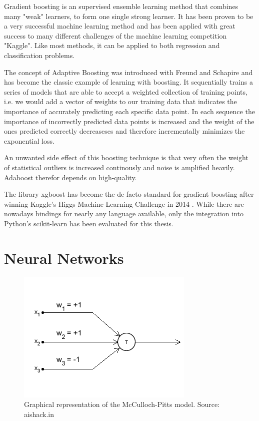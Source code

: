 Gradient boosting is an supervised ensemble learning method that combines many "weak" learners, to form one single strong learner.  It has been proven to be a very successful machine learning method and has been applied with great success to many different challenges of the machine learning competition "Kaggle". Like most methods, it can be applied to both regression and classification problems.

The concept of Adaptive Boosting was introduced with \cite{Freund97adecision-theoretic} Freund and Schapire and has become the classic example of learning with boosting. It sequentially trains a series of models that are able to accept a weighted collection of training points, i.e. we would add a vector of weights to our training data that indicates the importance of accurately predicting each specific data point. In each sequence the importance of incorrectly predicted data points is increased and the weight of the ones predicted correctly decreaseses and therefore incrementally minimizes the exponential loss.

An unwanted side effect of this boosting technique is that very often the weight of statistical outliers is increased continously and noise is amplified heavily. Adaboost therefor depends on high-quality. %

The library xgboost \cite{DBLP:journals/corr/ChenG16} has become the de facto standard for gradient boosting after winning Kaggle's Higgs Machine Learning Challenge in 2014 \cite{xgboost-wins}. While there are nowadays bindings for nearly any language available, only the integration into Python's scikit-learn has been evaluated for this thesis.



\section{Neural Networks}


\begin{figure}[h]
    \centering
	\includegraphics[width=.6\textwidth]{./images/illustrations/mcculloch-pitts}
    \caption{Graphical representation of the McCulloch-Pitts model. Source: aishack.in}
    \label{fig:mcculloch-pitts}
\end{figure}


